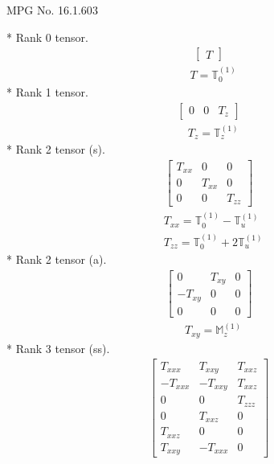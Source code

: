 \documentclass[fleqn,8pt,landscape]{jsarticle}
\begin{document}
\setcounter{MaxMatrixCols}{32}

\renewcommand{\tablename}{Table~}
\renewcommand{\figurename}{Figure~}
\begin{center}
\LARGE
MPG No. 16.1.60\quad$3$
\end{center}
* Rank 0 tensor.
\begin{align*}
\begin{bmatrix} T \end{bmatrix}
\end{align*}
\begin{align*}
& T = \mathbb{T}_{0}^{(1)}
\end{align*}
* Rank 1 tensor.
\begin{align*}
\begin{bmatrix} 0 & 0 & T_{z} \end{bmatrix}
\end{align*}
\begin{align*}
& T_{z} = \mathbb{T}_{z}^{(1)}
\end{align*}
* Rank 2 tensor (s).
\begin{align*}
\begin{bmatrix} T_{xx} & 0 & 0 \\ 0 & T_{xx} & 0 \\ 0 & 0 & T_{zz} \end{bmatrix}
\end{align*}
\begin{align*}
& T_{xx} = \mathbb{T}_{0}^{(1)} - \mathbb{T}_{u}^{(1)} \\
& T_{zz} = \mathbb{T}_{0}^{(1)} + 2 \mathbb{T}_{u}^{(1)}
\end{align*}
* Rank 2 tensor (a).
\begin{align*}
\begin{bmatrix} 0 & T_{xy} & 0 \\ - T_{xy} & 0 & 0 \\ 0 & 0 & 0 \end{bmatrix}
\end{align*}
\begin{align*}
& T_{xy} = \mathbb{M}_{z}^{(1)}
\end{align*}
* Rank 3 tensor (ss).
\begin{align*}
\begin{bmatrix} T_{xxx} & T_{xxy} & T_{xxz} \\ - T_{xxx} & - T_{xxy} & T_{xxz} \\ 0 & 0 & T_{zzz} \\ 0 & T_{xxz} & 0 \\ T_{xxz} & 0 & 0 \\ T_{xxy} & - T_{xxx} & 0 \end{bmatrix}
\end{align*}
\end{document}
